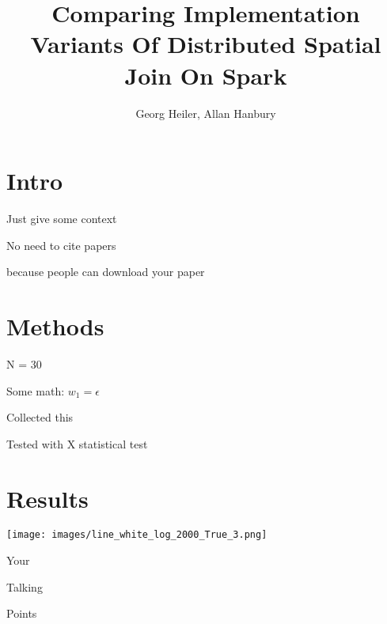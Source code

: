 \documentclass[a4paper]{article}
\title{Comparing Implementation Variants Of Distributed Spatial Join On Spark}
\author{Georg Heiler, Allan Hanbury}
\begin{document}





    \raggedcolumns
    \begin{multicols}{2}
        \section{Intro}
        \begin{compactitem}
            \item Just give some context
            \item No need to cite papers
            \item because people can download your paper
        \end{compactitem}
        
        \section{Methods}
        \begin{compactitem}
            \item N = 30
            \item Some math: $w_1 = \epsilon$
            \item Collected this
            \item Tested with X statistical test
        \end{compactitem}
        
    \columnbreak

        \section{Results}
        
        \texttt{[image: images/line\_white\_log\_2000\_True\_3.png]}

        \begin{compactitem}
            \item Your
            \item Talking
            \item Points
        \end{compactitem}
    
    \end{multicols}
\end{document}
